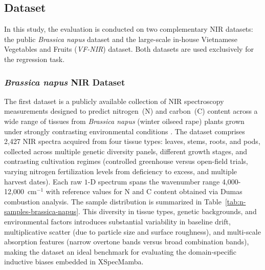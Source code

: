 \documentclass[pdflatex,sn-mathphys-num]{sn-jnl}%
\begin{document}
\subsection{Dataset}
In this study, the evaluation is conducted on two complementary NIR datasets: the public \textit{Brassica napus} dataset \cite{rolland2024comprehensive} and the large-scale in-house Vietnamese Vegetables and Fruits (\textit{VF-NIR}) dataset. Both datasets are used exclusively for the regression task.

\subsubsection{\textit{Brassica napus} NIR Dataset}
The first dataset is a publicly available collection of NIR 
spectroscopy measurements designed to predict nitrogen~(N) 
and carbon~(C) content across a wide range of tissues from 
\textit{Brassica napus} (winter oilseed rape) plants grown 
under strongly contrasting environmental conditions 
\cite{rolland2024comprehensive}. The dataset comprises 2,427 
NIR spectra acquired from four tissue types: leaves, stems, 
roots, and pods, collected across multiple genetic diversity 
panels, different growth stages, and contrasting cultivation 
regimes (controlled greenhouse versus open-field trials, 
varying nitrogen fertilization levels from deficiency to 
excess, and multiple harvest dates). Each raw $1$-D spectrum 
spans the wavenumber range 4,000-12,000~$\text{cm}^{-1}$ 
with reference values for N and C content obtained via 
Dumas combustion analysis. The sample distribution is 
summarized in Table~\ref{tab:n-samples-brassica-napus}. 
This diversity in tissue types, genetic backgrounds, and 
environmental factors introduces substantial variability in 
baseline drift, multiplicative scatter (due to particle size 
and surface roughness), and multi-scale absorption features 
(narrow overtone bands versus broad combination bands), 
making the dataset an ideal benchmark for evaluating the 
domain-specific inductive biases embedded in XSpecMamba.
\end{document}
